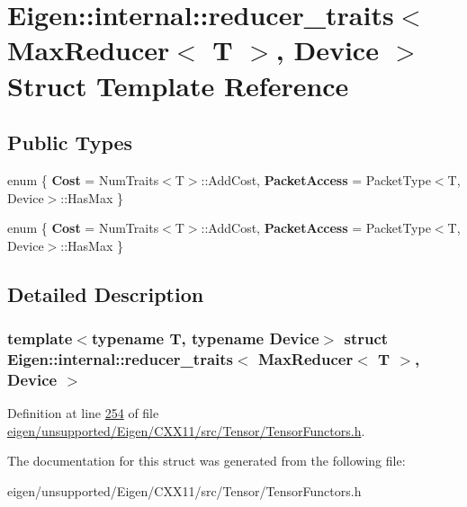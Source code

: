 \hypertarget{struct_eigen_1_1internal_1_1reducer__traits_3_01_max_reducer_3_01_t_01_4_00_01_device_01_4}{}\section{Eigen\+:\+:internal\+:\+:reducer\+\_\+traits$<$ Max\+Reducer$<$ T $>$, Device $>$ Struct Template Reference}
\label{struct_eigen_1_1internal_1_1reducer__traits_3_01_max_reducer_3_01_t_01_4_00_01_device_01_4}
\subsection*{Public Types}
\begin{DoxyCompactItemize}
\item 
\mbox{\label{struct_eigen_1_1internal_1_1reducer__traits_3_01_max_reducer_3_01_t_01_4_00_01_device_01_4_a69004bbb791ca791f43885aa725261d8}} 
enum \{ {\bfseries Cost} = Num\+Traits$<$T$>$\+:\+:Add\+Cost, 
{\bfseries Packet\+Access} = Packet\+Type$<$T, Device$>$\+:\+:Has\+Max
 \}
\item 
\mbox{\label{struct_eigen_1_1internal_1_1reducer__traits_3_01_max_reducer_3_01_t_01_4_00_01_device_01_4_aef78d75f6ec59d8f9c31b983bf4b1d12}} 
enum \{ {\bfseries Cost} = Num\+Traits$<$T$>$\+:\+:Add\+Cost, 
{\bfseries Packet\+Access} = Packet\+Type$<$T, Device$>$\+:\+:Has\+Max
 \}
\end{DoxyCompactItemize}


\subsection{Detailed Description}
\subsubsection*{template$<$typename T, typename Device$>$\newline
struct Eigen\+::internal\+::reducer\+\_\+traits$<$ Max\+Reducer$<$ T $>$, Device $>$}



Definition at line \hyperlink{eigen_2unsupported_2_eigen_2_c_x_x11_2src_2_tensor_2_tensor_functors_8h_source_l00254}{254} of file \hyperlink{eigen_2unsupported_2_eigen_2_c_x_x11_2src_2_tensor_2_tensor_functors_8h_source}{eigen/unsupported/\+Eigen/\+C\+X\+X11/src/\+Tensor/\+Tensor\+Functors.\+h}.



The documentation for this struct was generated from the following file\+:\begin{DoxyCompactItemize}
\item 
eigen/unsupported/\+Eigen/\+C\+X\+X11/src/\+Tensor/\+Tensor\+Functors.\+h\end{DoxyCompactItemize}

